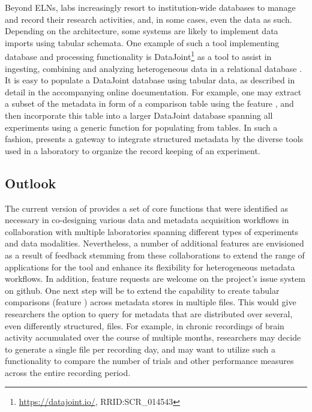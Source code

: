 Beyond ELNs, labs increasingly resort to institution-wide databases to manage and record their research activities, and, in some cases, even the data as such. Depending on the architecture, some systems are likely to implement data imports using tabular schemata. One example of such a tool implementing database and processing functionality is DataJoint\footnote{\url{https://datajoint.io/}, RRID:SCR\_014543} as a tool to assist in ingesting, combining and analyzing heterogeneous data in a relational database \citep{Yatsenko_2015}. It is easy to populate a DataJoint database using tabular data, as described in detail in the accompanying online documentation. For example, one may extract a subset of the metadata in form of a comparison table using the  feature \fcompare, and then incorporate this table into a larger DataJoint database spanning all experiments using a generic function for populating from  tables. In such a fashion,  presents a gateway to integrate structured metadata by the diverse tools used in a laboratory to organize the record keeping of an experiment.

\subsection{Outlook}
\label{sec:neo_outlook}
The current version of  provides a set of core functions that were identified as necessary in co-designing various data and metadata acquisition workflows in collaboration with multiple laboratories spanning different types of experiments and data modalities. Nevertheless, a number of additional features are envisioned as a result of feedback stemming from these collaborations to extend the range of applications for the tool and enhance its flexibility for heterogeneous metadata workflows. In addition, feature requests are welcome on the project's issue system on github. One next step will be to extend the capability to create tabular comparisons (feature \fcompare) across metadata stores in multiple files. This would give researchers the option to query for metadata that are distributed over several, even differently structured,  files. For example, in chronic recordings of brain activity accumulated over the course of multiple months, researchers may decide to generate a single  file per recording day, and may want to utilize such a functionality to compare the number of trials and other performance measures across the entire recording period.

